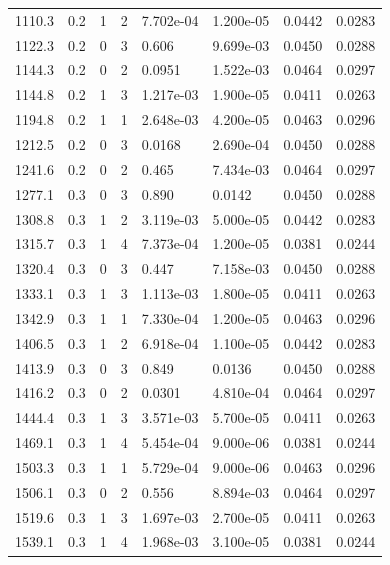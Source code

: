\documentclass[preview]{standalone}
\begin{document}
{{{\begin{tabular}{L{1.2cm}C{1.2cm} C{0.3cm}C{0.5cm} C{1.4cm}C{1.4cm} C{1.4cm}C{1.4cm}}
  1110.3  &   0.2  & 1     &  2 &  7.702e-04  & 1.200e-05  & 0.0442 &  0.0283   \\ 
  1122.3  &   0.2  & 0     &  3 &  0.606  & 9.699e-03  & 0.0450 &  0.0288   \\ 
  1144.3  &   0.2  & 0     &  2 &  0.0951  & 1.522e-03  & 0.0464 &  0.0297   \\ 
  1144.8  &   0.2  & 1     &  3 &  1.217e-03  & 1.900e-05  & 0.0411 &  0.0263   \\ 
  1194.8  &   0.2  & 1     &  1 &  2.648e-03  & 4.200e-05  & 0.0463 &  0.0296   \\ 
  1212.5  &   0.2  & 0     &  3 &  0.0168  & 2.690e-04  & 0.0450 &  0.0288   \\ 
  1241.6  &   0.2  & 0     &  2 &  0.465  & 7.434e-03  & 0.0464 &  0.0297   \\ 
  1277.1  &   0.3  & 0     &  3 &  0.890  & 0.0142  & 0.0450 &  0.0288   \\ 
  1308.8  &   0.3  & 1     &  2 &  3.119e-03  & 5.000e-05  & 0.0442 &  0.0283   \\ 
  1315.7  &   0.3  & 1     &  4 &  7.373e-04  & 1.200e-05  & 0.0381 &  0.0244   \\ 
  1320.4  &   0.3  & 0     &  3 &  0.447  & 7.158e-03  & 0.0450 &  0.0288   \\ 
  1333.1  &   0.3  & 1     &  3 &  1.113e-03  & 1.800e-05  & 0.0411 &  0.0263   \\ 
  1342.9  &   0.3  & 1     &  1 &  7.330e-04  & 1.200e-05  & 0.0463 &  0.0296   \\ 
  1406.5  &   0.3  & 1     &  2 &  6.918e-04  & 1.100e-05  & 0.0442 &  0.0283   \\ 
  1413.9  &   0.3  & 0     &  3 &  0.849  & 0.0136  & 0.0450 &  0.0288   \\ 
  1416.2  &   0.3  & 0     &  2 &  0.0301  & 4.810e-04  & 0.0464 &  0.0297   \\ 
  1444.4  &   0.3  & 1     &  3 &  3.571e-03  & 5.700e-05  & 0.0411 &  0.0263   \\ 
  1469.1  &   0.3  & 1     &  4 &  5.454e-04  & 9.000e-06  & 0.0381 &  0.0244   \\ 
  1503.3  &   0.3  & 1     &  1 &  5.729e-04  & 9.000e-06  & 0.0463 &  0.0296   \\ 
  1506.1  &   0.3  & 0     &  2 &  0.556  & 8.894e-03  & 0.0464 &  0.0297   \\ 
  1519.6  &   0.3  & 1     &  3 &  1.697e-03  & 2.700e-05  & 0.0411 &  0.0263   \\ 
  1539.1  &   0.3  & 1     &  4 &  1.968e-03  & 3.100e-05  & 0.0381 &  0.0244   \\ 

\end{tabular}}}}
\end{document}
